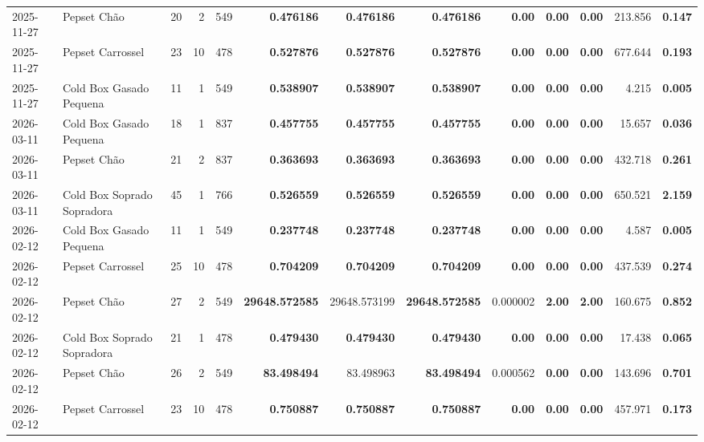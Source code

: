 {\begin{center}
{\begin{tabular}{@{}llrrrrrrrrrrr@{}}
2025-11-27 & Pepset Chão & 20 & 2 & 549 & \textbf{0.476186} & \textbf{0.476186} & \textbf{0.476186} & \textbf{0.00} & \textbf{0.00} & \textbf{0.00} & 213.856 & \textbf{0.147} \\
2025-11-27 & Pepset Carrossel & 23 & 10 & 478 & \textbf{0.527876} & \textbf{0.527876} & \textbf{0.527876} & \textbf{0.00} & \textbf{0.00} & \textbf{0.00} & 677.644 & \textbf{0.193} \\
2025-11-27 & Cold Box Gasado Pequena & 11 & 1 & 549 & \textbf{0.538907} & \textbf{0.538907} & \textbf{0.538907} & \textbf{0.00} & \textbf{0.00} & \textbf{0.00} & 4.215 & \textbf{0.005} \\
2026-03-11 & Cold Box Gasado Pequena & 18 & 1 & 837 & \textbf{0.457755} & \textbf{0.457755} & \textbf{0.457755} & \textbf{0.00} & \textbf{0.00} & \textbf{0.00} & 15.657 & \textbf{0.036} \\
2026-03-11 & Pepset Chão & 21 & 2 & 837 & \textbf{0.363693} & \textbf{0.363693} & \textbf{0.363693} & \textbf{0.00} & \textbf{0.00} & \textbf{0.00} & 432.718 & \textbf{0.261} \\
2026-03-11 & Cold Box Soprado Sopradora & 45 & 1 & 766 & \textbf{0.526559} & \textbf{0.526559} & \textbf{0.526559} & \textbf{0.00} & \textbf{0.00} & \textbf{0.00} & 650.521 & \textbf{2.159} \\
2026-02-12 & Cold Box Gasado Pequena & 11 & 1 & 549 & \textbf{0.237748} & \textbf{0.237748} & \textbf{0.237748} & \textbf{0.00} & \textbf{0.00} & \textbf{0.00} & 4.587 & \textbf{0.005} \\
2026-02-12 & Pepset Carrossel & 25 & 10 & 478 & \textbf{0.704209} & \textbf{0.704209} & \textbf{0.704209} & \textbf{0.00} & \textbf{0.00} & \textbf{0.00} & 437.539 & \textbf{0.274} \\
2026-02-12 & Pepset Chão & 27 & 2 & 549 & \textbf{29648.572585} & 29648.573199 & \textbf{29648.572585} & 0.000002 & \textbf{2.00} & \textbf{2.00} & 160.675 & \textbf{0.852} \\
2026-02-12 & Cold Box Soprado Sopradora & 21 & 1 & 478 & \textbf{0.479430} & \textbf{0.479430} & \textbf{0.479430} & \textbf{0.00} & \textbf{0.00} & \textbf{0.00} & 17.438 & \textbf{0.065} \\
2026-02-12 & Pepset Chão & 26 & 2 & 549 & \textbf{83.498494} & 83.498963 & \textbf{83.498494} & 0.000562 & \textbf{0.00} & \textbf{0.00} & 143.696 & \textbf{0.701} \\
2026-02-12 & Pepset Carrossel & 23 & 10 & 478 & \textbf{0.750887} & \textbf{0.750887} & \textbf{0.750887} & \textbf{0.00} & \textbf{0.00} & \textbf{0.00} & 457.971 & \textbf{0.173} \\

\end{tabular}}
\end{center}}
